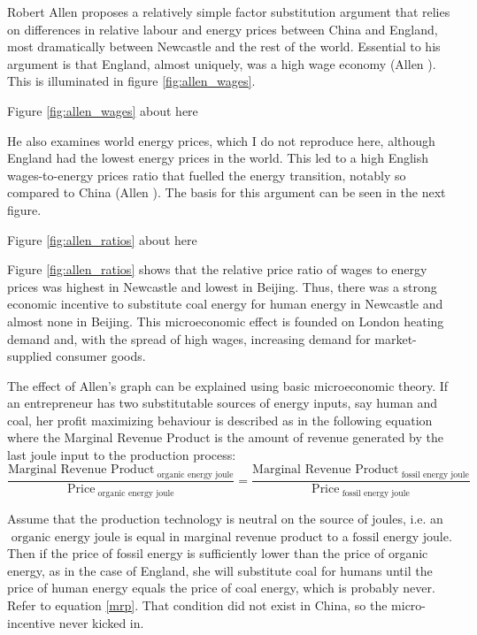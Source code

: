 \documentclass[12pt]{article}
\numberwithin{equation}{section}
\begin{document}
		Robert Allen proposes a relatively simple factor substitution argument that relies on differences in relative labour and energy prices between China and England, most dramatically between Newcastle and the rest of the world. Essential to his argument is that England, almost uniquely, was a high wage economy (Allen \citeyear[p.~34]{allen_british_2009}). This is illuminated in figure \ref{fig:allen_wages}. 
		
\begin{center}
Figure \ref{fig:allen_wages} about here
\end{center}		
		
		He also examines world energy prices, which I do not reproduce here, although England had the lowest energy prices in the world. This led to a high English wages-to-energy prices ratio that fuelled the energy transition, notably so compared to China (Allen \citeyear[p.~140]{allen_british_2009}). The basis for this argument can be seen in the next figure. 

\begin{center}
Figure \ref{fig:allen_ratios} about here
\end{center}			
		
		
		Figure \ref{fig:allen_ratios} shows that the relative price ratio of wages to energy prices was highest in Newcastle and lowest in Beijing. Thus, there was a strong economic incentive to substitute coal energy for human energy in Newcastle and almost none in Beijing. This microeconomic effect is founded on London heating demand and, with the spread of high wages, increasing demand for market-supplied consumer goods.
		
		The effect of Allen's graph can be explained using basic microeconomic theory. If an entrepreneur has two substitutable sources of energy inputs, say human and coal, her profit maximizing behaviour is described as in the following equation where the Marginal Revenue Product is the amount of revenue generated by the last joule input to the production process:
		\begin{equation}
		\label{mrp}
		\frac{\text{Marginal Revenue Product}_{\text{ organic energy joule}}}{\text{Price}_{\text{ organic energy joule}}} = \frac{\text{Marginal Revenue Product}_{\text{ fossil energy joule}}}{\text{Price}_{\text{ fossil energy joule}}}
		\end{equation}
		
		Assume that the production technology is neutral on the source of joules, i.e. an $\text{ organic energy joule}$ is equal in marginal revenue product to a $\text{fossil energy joule}$. Then if the price of fossil energy is sufficiently lower than the price of organic energy, as in the case of England, she will substitute coal for humans until the price of human energy equals the price of coal energy, which is probably never. Refer to equation \ref{mrp}. That condition did not exist in China, so the micro-incentive never kicked in.
		
\end{document}
